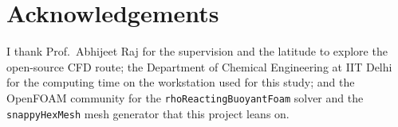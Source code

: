 \documentclass[11pt,a4paper]{article}
\begin{document}
\section*{Acknowledgements}
I thank Prof.~Abhijeet Raj for the supervision and the latitude to
explore the open-source CFD route; the Department of Chemical
Engineering at IIT Delhi for the computing time on the workstation
used for this study; and the OpenFOAM community for the
\texttt{rhoReactingBuoyantFoam} solver and the
\texttt{snappyHexMesh} mesh generator that this project leans on.



\end{document}
